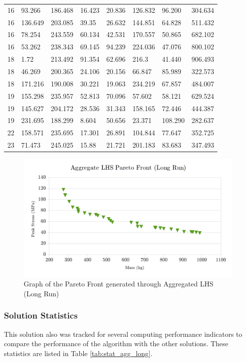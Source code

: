 \begin{table}[!htbp]
\begin{tabular}{|p{1.5cm}p{1.5cm}p{1.5cm}p{1.4cm}p{2cm}p{2cm}||p{1.5cm}p{1.5cm}|}
16&93.266&186.468&16.423&20.836&126.832&96.200&304.634\\
16&136.649&203.085&39.35&26.632&144.851&64.828&511.432\\
16&78.254&243.559&60.134&42.531&170.557&50.865&682.102\\
16&53.262&238.343&69.145&94.239&224.036&47.076&800.102\\
18&1.72&213.492&91.354&62.696&216.3&41.440&906.493\\
18&46.269&200.365&24.106&20.156&66.847&85.989&322.573\\
18&171.216&190.008&30.221&19.063&234.219&67.857&484.007\\
19&155.298&235.957&52.813&70.096&57.602&58.121&629.524\\
19&145.627&204.172&28.536&31.343&158.165&72.446&444.387\\
19&231.695&188.299&8.604&50.656&23.371&108.290&282.637\\
22&158.571&235.695&17.301&26.891&104.844&77.647&352.725\\
23&71.473&245.025&15.88&21.721&201.183&83.683&347.493\\
\hline
\end{tabular}
\end{table}

\begin{figure}[!hbp]
\includegraphics[width=\textwidth]{img/pf_agg_long.png}
\caption{Graph of the Pareto Front generated through Aggregated LHS (Long Run)}
\label{fig:pfront_agg_long}
\end{figure}

\subsubsection{Solution Statistics}
This solution also was tracked for several computing performance indicators to compare the performance of the algorithm with the other solutions. These statistics are listed in Table \ref{tab:stat_agg_long}. 

